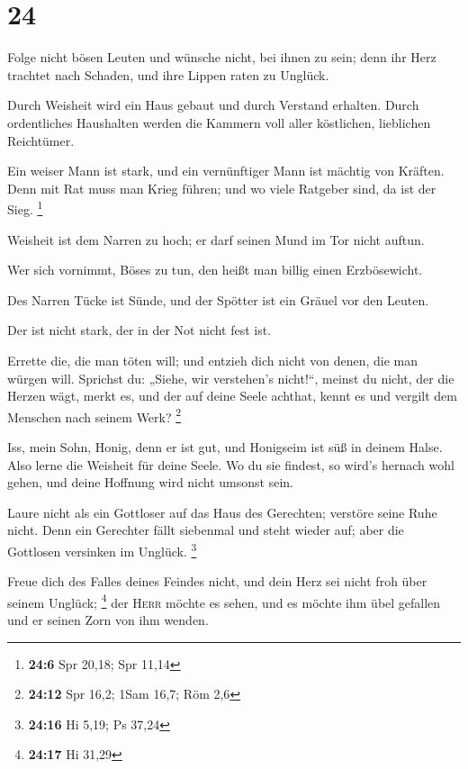 \hypertarget{section-23}{%
\section{24}\label{section-23}}

 Folge nicht bösen Leuten und wünsche nicht, bei ihnen zu
sein;  denn ihr Herz trachtet nach Schaden, und ihre
Lippen raten zu Unglück.

 Durch Weisheit wird ein Haus gebaut und durch Verstand
erhalten.  Durch ordentliches Haushalten werden die
Kammern voll aller köstlichen, lieblichen Reichtümer.

 Ein weiser Mann ist stark, und ein vernünftiger Mann ist
mächtig von Kräften.  Denn mit Rat muss man Krieg führen;
und wo viele Ratgeber sind, da ist der Sieg. \footnote{\textbf{24:6} Spr
  20,18; Spr 11,14}

 Weisheit ist dem Narren zu hoch; er darf seinen Mund im
Tor nicht auftun.

 Wer sich vornimmt, Böses zu tun, den heißt man billig
einen Erzbösewicht.

 Des Narren Tücke ist Sünde, und der Spötter ist ein
Gräuel vor den Leuten.

 Der ist nicht stark, der in der Not nicht fest ist.

 Errette die, die man töten will; und entzieh dich nicht
von denen, die man würgen will.  Sprichst du: „Siehe, wir
verstehen's nicht!{}``, meinst du nicht, der die Herzen wägt, merkt es,
und der auf deine Seele achthat, kennt es und vergilt dem Menschen nach
seinem Werk? \footnote{\textbf{24:12} Spr 16,2; 1Sam 16,7; Röm 2,6}

 Iss, mein Sohn, Honig, denn er ist gut, und Honigseim
ist süß in deinem Halse.  Also lerne die Weisheit für
deine Seele. Wo du sie findest, so wird's hernach wohl gehen, und deine
Hoffnung wird nicht umsonst sein.

 Laure nicht als ein Gottloser auf das Haus des
Gerechten; verstöre seine Ruhe nicht.  Denn ein Gerechter
fällt siebenmal und steht wieder auf; aber die Gottlosen versinken im
Unglück. \footnote{\textbf{24:16} Hi 5,19; Ps 37,24}

 Freue dich des Falles deines Feindes nicht, und dein
Herz sei nicht froh über seinem Unglück; \footnote{\textbf{24:17} Hi
  31,29}  der \textsc{Herr} möchte es sehen, und es
möchte ihm übel gefallen und er seinen Zorn von ihm wenden.

